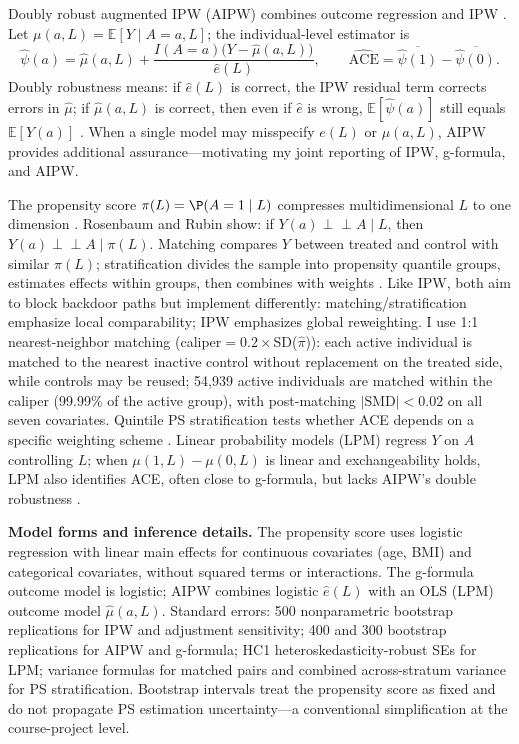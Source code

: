\documentclass[12pt,a4paper]{article}
\newcommand{\E}{\mathbb{E}}
\newcommand{\indep}{\perp\!\!\!\perp}
\begin{document}
Doubly robust augmented IPW (AIPW) combines outcome regression and IPW \cite{robins1994estimation,hernan2024whatif}. Let $\mu(a,L)=\E[Y\mid A=a,L]$; the individual-level estimator is
\[
\hat\psi(a)=\hat\mu(a,L)+\frac{I(A=a)\bigl(Y-\hat\mu(a,L)\bigr)}{\hat e(L)},\qquad
\widehat{\mathrm{ACE}}=\overline{\hat\psi(1)}-\overline{\hat\psi(0)}.
\]
Doubly robustness means: if $\hat e(L)$ is correct, the IPW residual term corrects errors in $\hat\mu$; if $\hat\mu(a,L)$ is correct, then even if $\hat e$ is wrong, $\E[\hat\psi(a)]$ still equals $\E[Y(a)]$ \cite{robins1994estimation,shahu2023comparison}. When a single model may misspecify $e(L)$ or $\mu(a,L)$, AIPW provides additional assurance---motivating my joint reporting of IPW, g-formula, and AIPW.

The propensity score $\pi(L)=\P(A=1\mid L)$ compresses multidimensional $L$ to one dimension \cite{rosenbaum1983central}. Rosenbaum and Rubin show: if $Y(a)\indep A\mid L$, then $Y(a)\indep A\mid \pi(L)$. Matching compares $Y$ between treated and control with similar $\hat\pi(L)$; stratification divides the sample into propensity quantile groups, estimates effects within groups, then combines with weights \cite{rosenbaum1983central,chen2024iptw}. Like IPW, both aim to block backdoor paths but implement differently: matching/stratification emphasize local comparability; IPW emphasizes global reweighting. I use 1:1 nearest-neighbor matching (caliper$=0.2\times$SD($\hat\pi$)): each active individual is matched to the nearest inactive control without replacement on the treated side, while controls may be reused; 54{,}939 active individuals are matched within the caliper (99.99\% of the active group), with post-matching $|\mathrm{SMD}|<0.02$ on all seven covariates. Quintile PS stratification tests whether ACE depends on a specific weighting scheme \cite{rosenbaum1983central}. Linear probability models (LPM) regress $Y$ on $A$ controlling $L$; when $\mu(1,L)-\mu(0,L)$ is linear and exchangeability holds, LPM also identifies ACE, often close to g-formula, but lacks AIPW's double robustness \cite{hernan2024whatif}.

\textbf{Model forms and inference details.} The propensity score uses logistic regression with linear main effects for continuous covariates (age, BMI) and categorical covariates, without squared terms or interactions. The g-formula outcome model is logistic; AIPW combines logistic $\hat e(L)$ with an OLS (LPM) outcome model $\hat\mu(a,L)$. Standard errors: 500 nonparametric bootstrap replications for IPW and adjustment sensitivity; 400 and 300 bootstrap replications for AIPW and g-formula; HC1 heteroskedasticity-robust SEs for LPM; variance formulas for matched pairs and combined across-stratum variance for PS stratification. Bootstrap intervals treat the propensity score as fixed and do not propagate PS estimation uncertainty---a conventional simplification at the course-project level.
\end{document}
